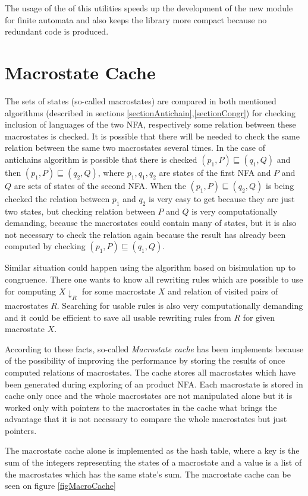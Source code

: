 The usage of the of this utilities speeds up the development of the new module for finite automata and also keeps the library more compact because no
redundant code is produced.

\section{Macrostate Cache}
\label{sectionCache}
The sets of states (so-called macrostates) are compared in both mentioned algorithms (described in sections \ref{sectionAntichain},\ref{sectionCongr}) 
for checking inclusion of languages of the two NFA, 
respectively some relation between these macrostates is checked. It is possible that there will be needed to check the same relation between the same
two macrostates several times. In the case of antichains algorithm is possible that there is checked $(p_1,P) \sqsubseteq (q_1,Q)$ and then $(p_1,P)\sqsubseteq
(q_2,Q)$, where $p_1,q_1,q_2$ are states of the first NFA and $P$ and $Q$ are sets of states of the second NFA. 
When the $(p_1,P)\sqsubseteq(q_2,Q)$ is being checked the relation between $p_1$ and $q_2$ is very easy to get because they are just two states, but checking
relation between $P$ and $Q$ is very computationally demanding, because the macrostates could contain many of states, but it is also not necessary to
check the relation again because the result has already been computed by checking $(p_1,P) \sqsubseteq (q_1,Q)$. 

Similar situation could happen using the algorithm based on bisimulation up to congruence. There one wants to know all rewriting rules which are possible to use
for computing $X{\downarrow_R}$ for some macrostate $X$ and relation of visited pairs of macrostates $R$. Searching for usable rules is also very computationally
demanding and it could be efficient to save all usable rewriting rules from $R$ for given macrostate $X$.

According to these facts, so-called \emph{Macrostate cache} has been implements because of the possibility of improving the performance by storing the results of 
once computed relations of macrostates. The cache stores all macrostates which have been generated during exploring of an product NFA. Each macrostate is 
stored in cache only once and the whole macrostates are not manipulated alone  
but it is worked only with pointers to the macrostates in the cache what brings the advantage that it is not 
necessary to compare the whole macrostates but just pointers.

The macrostate cache alone is implemented as the hash table, where a key is the sum of the integers representing the states of a macrostate and a value is a
list of the macrostates which has the same state's sum. The macrostate cache can be seen on figure \ref{figMacroCache}

